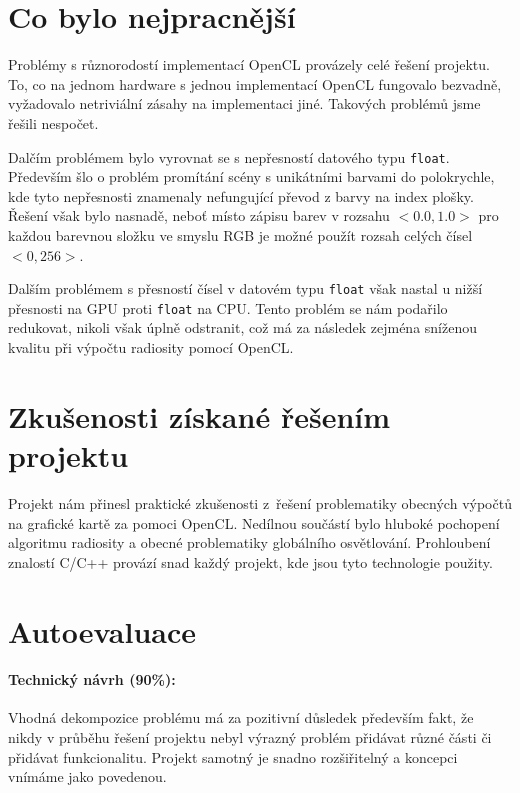 \documentclass[11pt,a4paper]{article}
\begin{document}
\section{Co bylo nejpracnější}
Problémy s různorodostí implementací OpenCL provázely celé řešení projektu. To, co na jednom hardware s jednou implementací OpenCL fungovalo bezvadně, vyžadovalo netriviální zásahy na implementaci jiné. Takových problémů jsme řešili nespočet.

Dalčím problémem bylo vyrovnat se s nepřesností datového typu \texttt{float}. Především šlo o problém promítání scény s unikátními barvami do polokrychle, kde tyto nepřesnosti znamenaly nefungující převod z barvy na index plošky. Řešení však bylo nasnadě, neboť místo zápisu barev v rozsahu $<0.0,1.0>$ pro každou barevnou složku ve smyslu RGB je možné použít rozsah celých čísel $<0,256>$.

Dalším problémem s přesností čísel v datovém typu \texttt{float} však nastal u nižší přesnosti na GPU proti \texttt{float} na CPU. Tento problém se nám podařilo redukovat, nikoli však úplně odstranit, což má za následek zejména sníženou kvalitu při výpočtu radiosity pomocí OpenCL.

\section{Zkušenosti získané řešením projektu}
Projekt nám přinesl praktické zkušenosti z~řešení problematiky obecných výpočtů na grafické kartě za pomoci OpenCL. Nedílnou součástí bylo hluboké pochopení algoritmu radiosity a obecné problematiky globálního osvětlování. Prohloubení znalostí C/C++ provází snad každý projekt, kde jsou tyto technologie použity.

\section{Autoevaluace}
\paragraph{Technický návrh (90\%):} 
Vhodná dekompozice problému má za pozitivní důsledek především fakt, že nikdy v průběhu řešení projektu nebyl výrazný problém přidávat různé části či přidávat funkcionalitu. Projekt samotný je snadno rozšiřitelný a koncepci vnímáme jako povedenou.
\end{document}
